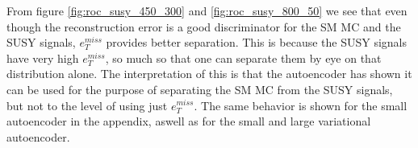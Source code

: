 From figure \ref{fig:roc_susy_450_300} and \ref{fig:roc_susy_800_50} we see that even though the reconstruction error is a good discriminator for the SM MC and the SUSY signals, 
$e_T^{miss}$ provides better separation. This is because the SUSY signals have very high $e_T^{miss}$, so much so that one can separate them by eye on that distribution alone. 
The interpretation of this is that the autoencoder has shown it can be used for the purpose of separating the SM MC from the SUSY signals, but not to the level of using just $e_T^{miss}$. 
The same behavior is shown for the small autoencoder in the appendix, aswell as for the small and large variational autoencoder. 